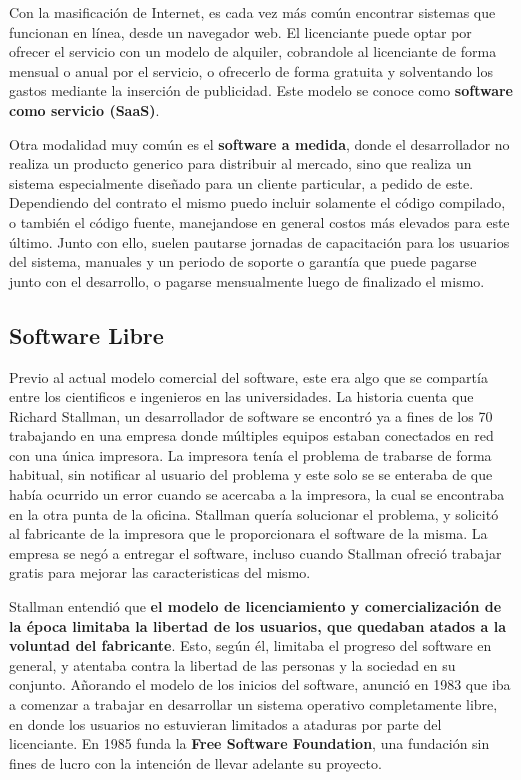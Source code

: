 Con la masificación de Internet, es cada vez más común encontrar sistemas que
funcionan en línea, desde un navegador web. El licenciante puede optar por ofrecer
el servicio con un modelo de alquiler, cobrandole al licenciante de forma
mensual o anual por el servicio, o ofrecerlo de forma gratuita y solventando los
gastos mediante la inserción de publicidad. Este modelo se conoce como \textbf{
software como servicio (SaaS)}.

Otra modalidad muy común es el \textbf{software a medida}, donde el desarrollador
no realiza un producto generico para distribuir al mercado, sino que realiza un
sistema especialmente diseñado para un cliente particular, a pedido de este.
Dependiendo del contrato el mismo puedo incluir solamente el código compilado,
o también el código fuente, manejandose en general costos más elevados para este
último. Junto con ello, suelen pautarse jornadas de capacitación para los usuarios
del sistema, manuales y un periodo de soporte o garantía que puede pagarse junto
con el desarrollo, o pagarse mensualmente luego de finalizado el mismo.\autocite{saxena_2017}


\subsection{Software Libre}

Previo al actual modelo comercial del software, este era algo que se compartía
entre los cientificos e ingenieros en las universidades. La historia cuenta que
Richard Stallman, un desarrollador de software se encontró ya a fines de los
70 trabajando en una empresa donde múltiples equipos estaban conectados en red
con una única impresora. La impresora tenía el problema de trabarse de forma
habitual, sin notificar al usuario del problema y este solo se se enteraba de
que había ocurrido un error cuando se acercaba a la impresora, la cual se
encontraba en la otra punta de la oficina. Stallman quería solucionar el
problema, y solicitó al fabricante de la impresora que le proporcionara el
software de la misma. La empresa se negó a entregar el software, incluso
cuando Stallman ofreció trabajar gratis para mejorar las caracteristicas del
mismo.

Stallman entendió que \textbf{el modelo de licenciamiento y comercialización
de la época limitaba la libertad de los usuarios, que quedaban atados a la
voluntad del fabricante}. Esto, según él, limitaba el progreso del software en
general, y atentaba contra la libertad de las personas y la sociedad en su
conjunto. Añorando el modelo de los inicios del software, anunció en 1983 que
iba a comenzar a trabajar en desarrollar un sistema operativo completamente libre,
en donde los usuarios no estuvieran limitados a ataduras por parte del licenciante.
En 1985 funda la \textbf{Free Software Foundation}, una fundación sin fines de
lucro con la intención de llevar adelante su proyecto.

